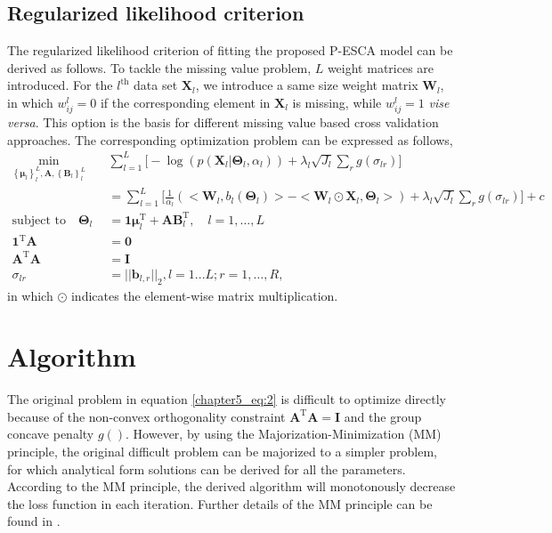\subsection{Regularized likelihood criterion}
The regularized likelihood criterion of fitting the proposed P-ESCA model can be derived as follows. To tackle the missing value problem, $L$ weight matrices are introduced. For the $l^{\text{th}}$ data set $\mathbf{X}_l$, we introduce a same size weight matrix $\mathbf{W}_l$, in which $w_{ij}^{l} = 0$ if the corresponding element in $\mathbf{X}_l$ is missing, while $w_{ij}^{l} = 1$  \textit{vise versa}. This option is the basis for different missing value based cross validation approaches. The corresponding optimization problem can be expressed as follows,
\begin{equation}\label{chapter5_eq:2}
\begin{aligned}
    \min_{ \left\{\bm{\mu}_l\right\}_{l}^{L}, \mathbf{A}, \left\{\mathbf{B}_l\right\}_{l}^{L}} \quad & \sum_{l=1}^{L} \Big[ -\log(p(\mathbf{X}_l|\mathbf{\Theta}_l, \alpha_l)) + \lambda_l \sqrt{J_l} \sum_{r} g(\sigma_{lr}) \Big] \\
	&= \sum_{l=1}^{L} \Big[ \frac{1}{\alpha_l}( <\mathbf{W}_l, b_l(\mathbf{\Theta}_l)> - <\mathbf{W}_l \odot \mathbf{X}_l,\mathbf{\Theta}_l>) + \lambda_l \sqrt{J_l} \sum_{r} g(\sigma_{lr}) \Big] + c\\
    \text{subject to} \quad \mathbf{\Theta}_l &= \mathbf{1}\bm{\mu}_l^{\text{T}} + \mathbf{AB}_l^{\text{T}}, \quad l = 1,\ldots,L \\
     \mathbf{1}^{\text{T}}\mathbf{A} &= \mathbf{0}\\
	 \mathbf{A}^{\text{T}}\mathbf{A} &= \mathbf{I} \\
	 \sigma_{lr} &= ||\mathbf{b}_{l,r}||_2, l = 1...L; r = 1,\ldots, R,
\end{aligned}
\end{equation}
in which $\odot$ indicates the element-wise matrix multiplication.

\section{Algorithm} \label{section:5.3}
The original problem in equation \ref{chapter5_eq:2} is difficult to optimize directly because of the non-convex orthogonality constraint $\mathbf{A}^{\text{T}}\mathbf{A} = \mathbf{I}$ and the group concave penalty $g()$. However, by using the Majorization-Minimization (MM) principle, the original difficult problem can be majorized to a simpler problem, for which analytical form solutions can be derived for all the parameters. According to the MM principle, the derived algorithm will monotonously decrease the loss function in each iteration. Further details of the MM principle can be found in \cite{de1994block,hunter2004tutorial}.

